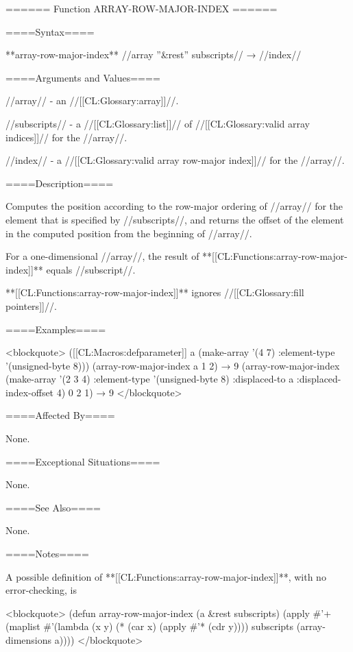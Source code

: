 ====== Function ARRAY-ROW-MAJOR-INDEX ======

====Syntax====

**array-row-major-index** //array ''&rest'' subscripts// → //index//

====Arguments and Values====

//array// - an //[[CL:Glossary:array]]//.

//subscripts// - a //[[CL:Glossary:list]]// of //[[CL:Glossary:valid array indices]]// for the //array//.

//index// - a //[[CL:Glossary:valid array row-major index]]// for the //array//.

====Description====

Computes the position according to the row-major ordering of //array// for the element that is specified by //subscripts//, and returns the offset of the element in the computed position from the beginning of //array//.

For a one-dimensional //array//, the result of **[[CL:Functions:array-row-major-index]]** equals //subscript//.

**[[CL:Functions:array-row-major-index]]** ignores //[[CL:Glossary:fill pointers]]//.

====Examples====

<blockquote> ([[CL:Macros:defparameter]] a (make-array '(4 7) :element-type '(unsigned-byte 8))) (array-row-major-index a 1 2) → 9 (array-row-major-index (make-array '(2 3 4) :element-type '(unsigned-byte 8) :displaced-to a :displaced-index-offset 4) 0 2 1) → 9 </blockquote>

====Affected By====

None.

====Exceptional Situations====

None.

====See Also====

None.

====Notes====

A possible definition of **[[CL:Functions:array-row-major-index]]**, with no error-checking, is

<blockquote> (defun array-row-major-index (a &rest subscripts) (apply #'+ (maplist #'(lambda (x y) (* (car x) (apply #'* (cdr y)))) subscripts (array-dimensions a)))) </blockquote>

